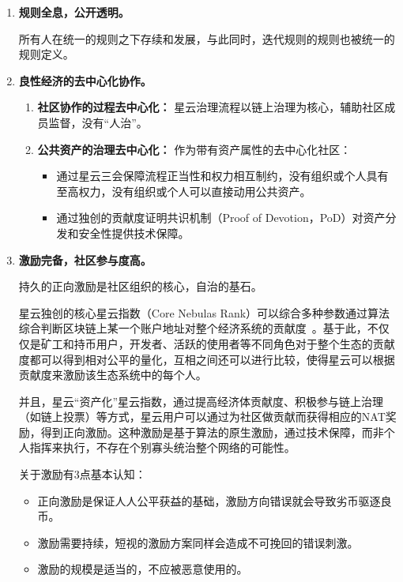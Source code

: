 \begin{enumerate}
	\item 

	\textbf{规则全息，公开透明。} 

	所有人在统一的规则之下存续和发展，与此同时，迭代规则的规则也被统一的规则定义。


	\item 

	\textbf{良性经济的去中心化协作。}

	\begin{enumerate}
		\item 

		\textbf{社区协作的过程去中心化：} 星云治理流程以链上治理为核心，辅助社区成员监督，没有“人治”。
	
		\item 

		\textbf{公共资产的治理去中心化：} 作为带有资产属性的去中心化社区：

		\begin{itemize}
			\item 通过星云三会保障流程正当性和权力相互制约，没有组织或个人具有至高权力，没有组织或个人可以直接动用公共资产。
			\item 通过独创的贡献度证明共识机制（Proof of Devotion，PoD）对资产分发和安全性提供技术保障。
		\end{itemize}

	\end{enumerate}

	\item 

	\textbf{激励完备，社区参与度高。}
	
	持久的正向激励是社区组织的核心，自治的基石。

	星云独创的核心星云指数（Core Nebulas Rank）可以综合多种参数通过算法综合判断区块链上某一个账户地址对整个经济系统的贡献度~\cite{yellowpaper}。基于此，不仅仅是矿工和持币用户，开发者、活跃的使用者等不同角色对于整个生态的贡献度都可以得到相对公平的量化，互相之间还可以进行比较，使得星云可以根据贡献度来激励该生态系统中的每个人。

	并且，星云“资产化”星云指数，通过提高经济体贡献度、积极参与链上治理（如链上投票）等方式，星云用户可以通过为社区做贡献而获得相应的NAT奖励，得到正向激励。这种激励是基于算法的原生激励，通过技术保障，而非个人指挥来执行，不存在个别寡头统治整个网络的可能性。

	关于激励有3点基本认知：

	\begin{itemize}
		\item 正向激励是保证人人公平获益的基础，激励方向错误就会导致劣币驱逐良币。
		\item 激励需要持续，短视的激励方案同样会造成不可挽回的错误刺激。
		\item 激励的规模是适当的，不应被恶意使用的。
	\end{itemize}


\end{enumerate}
